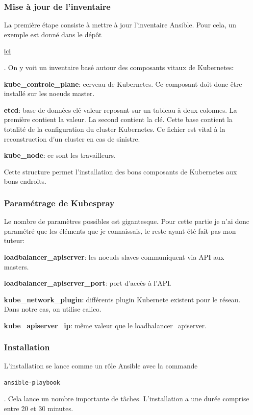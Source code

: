 \documentclass[12pt, a4paper, twoside]{article}
\begin{document}
\subsubsection{Mise à jour de l'inventaire}
La première étape consiste à mettre à jour l'inventaire \gls{Ansible}.
Pour cela, un exemple est donné dans le dépôt \begin{hilite}\href{https://github.com/kubernetes-sigs/kubespray/blob/master/inventory/sample/inventory.ini}{ici}\end{hilite}.
On y voit un inventaire basé autour des composants vitaux de \gls{Kubernetes}:

\textbf{kube\_controle\_plane}: cerveau de \gls{Kubernetes}.
Ce composant doit donc être installé sur les noeuds master.

\textbf{etcd}: base de données clé-valeur reposant sur un tableau à deux colonnes.
    La première contient la valeur.
    La second contient la clé.
    Cette base contient la totalité de la configuration du \gls{cluster} \gls{Kubernetes}.
    Ce fichier est vital à la reconstruction d'un \gls{cluster} en cas de sinistre.

\textbf{kube\_node}: ce sont les travailleurs.


Cette structure permet l'installation des bons composants de \gls{Kubernetes} aux bons endroits.

\subsubsection{Paramétrage de Kubespray}
Le nombre de paramètres possibles est gigantesque.
Pour cette partie je n'ai donc paramétré que les éléments que je connaissais, le reste ayant été fait pas mon tuteur:

\textbf{loadbalancer\_apiserver}: les noeuds slaves communiquent via \gls{API} aux masters.

\textbf{loadbalancer\_apiserver\_port}: port d'accès à l'\gls{API}.

 \textbf{kube\_network\_plugin}: différents plugin Kubernete existent pour le réseau.
    Dans notre cas, on utilise calico.

\textbf{kube\_apiserver\_ip}: même valeur que le loadbalancer\_apiserver.


\subsubsection{Installation}
L'installation se lance comme un rôle Ansible avec la commande \begin{code}\texttt{ansible-playbook}\end{code}.
Cela lance un nombre importante de tâches.
L'installation a une durée comprise entre 20 et 30 minutes.
\end{document}
